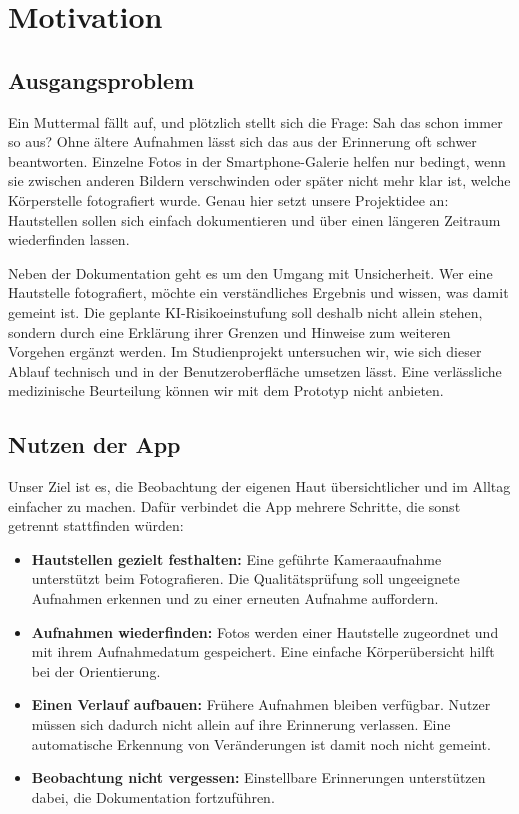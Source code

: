 \section{Motivation}
\label{chap:motivation}

\subsection{Ausgangsproblem}

Ein Muttermal fällt auf, und plötzlich stellt sich die Frage: Sah das schon immer so aus? Ohne ältere Aufnahmen lässt sich das aus der Erinnerung oft schwer beantworten. Einzelne Fotos in der Smartphone-Galerie helfen nur bedingt, wenn sie zwischen anderen Bildern verschwinden oder später nicht mehr klar ist, welche Körperstelle fotografiert wurde. Genau hier setzt unsere Projektidee an: Hautstellen sollen sich einfach dokumentieren und über einen längeren Zeitraum wiederfinden lassen.

Neben der Dokumentation geht es um den Umgang mit Unsicherheit. Wer eine Hautstelle fotografiert, möchte ein verständliches Ergebnis und wissen, was damit gemeint ist. Die geplante KI-Risikoeinstufung soll deshalb nicht allein stehen, sondern durch eine Erklärung ihrer Grenzen und Hinweise zum weiteren Vorgehen ergänzt werden. Im Studienprojekt untersuchen wir, wie sich dieser Ablauf technisch und in der Benutzeroberfläche umsetzen lässt. Eine verlässliche medizinische Beurteilung können wir mit dem Prototyp nicht anbieten.

\subsection{Nutzen der App}

Unser Ziel ist es, die Beobachtung der eigenen Haut übersichtlicher und im Alltag einfacher zu machen. Dafür verbindet die App mehrere Schritte, die sonst getrennt stattfinden würden:

\begin{itemize}
\item \textbf{Hautstellen gezielt festhalten:} Eine geführte Kameraaufnahme unterstützt beim Fotografieren. Die Qualitätsprüfung soll ungeeignete Aufnahmen erkennen und zu einer erneuten Aufnahme auffordern.
\item \textbf{Aufnahmen wiederfinden:} Fotos werden einer Hautstelle zugeordnet und mit ihrem Aufnahmedatum gespeichert. Eine einfache Körperübersicht hilft bei der Orientierung.
\item \textbf{Einen Verlauf aufbauen:} Frühere Aufnahmen bleiben verfügbar. Nutzer müssen sich dadurch nicht allein auf ihre Erinnerung verlassen. Eine automatische Erkennung von Veränderungen ist damit noch nicht gemeint.
\item \textbf{Beobachtung nicht vergessen:} Einstellbare Erinnerungen unterstützen dabei, die Dokumentation fortzuführen.
\end{itemize}

